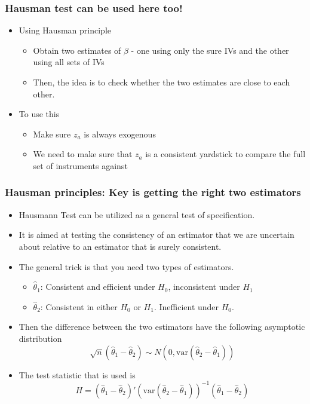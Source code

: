 \documentclass[aspectratio=169]{beamer}
\begin{document}
\begin{frame}
\frametitle{Hausman test can be used here too!}
\begin{itemize}
\item Using Hausman principle
\begin{itemize}
\item  Obtain two estimates of $\beta$ - one using only the sure IVs and the other using all sets of IVs
\item Then, the idea is to check whether the two estimates are close to each other. 
\end{itemize}
\item To use this
\begin{itemize}
\item Make sure $z_a$ is always exogenous
\item We need to make sure that $z_a$ is a consistent yardstick to compare the full set of instruments against
\end{itemize}
\end{itemize}
\end{frame}

\begin{frame}
\frametitle{Hausman principles: Key is getting the right two estimators}
\begin{itemize}
\item Hausmann Test can be utilized as a general test of specification. 
\item It is aimed at testing the consistency of an estimator that we are uncertain about relative to an estimator that is surely consistent. 
\item The general trick is that you need two types of estimators. 
\begin{itemize}
\item $\hat{\theta}_1$: Consistent and efficient under $H_0$, inconsistent under $H_1$
\item $\hat{\theta}_2$: Consistent in either $H_0$ or $H_1$. Inefficient under $H_0$. 
\end{itemize}
\item Then the difference between the two estimators have the following asymptotic distribution
\[
\sqrt{n}(\hat{\theta}_1-\hat{\theta}_2) \sim N(0, \text{var}(\hat{\theta}_2-\hat{\theta}_1))
\]
\item The test statistic that is used is
\[
H=(\hat{\theta}_1-\hat{\theta}_2)'(\text{var}(\hat{\theta}_2-\hat{\theta}_1))^{-1}(\hat{\theta}_1-\hat{\theta}_2)
\] 
\end{itemize}
\end{frame}
\end{document}
